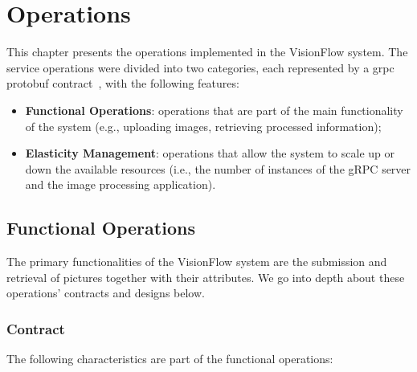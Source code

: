 \chapter{Operations}\label{ch:operations}

This chapter presents the operations implemented in the VisionFlow system.
The service operations were divided into two categories, each represented by a grpc protobuf contract~\cite{grpc-protobuf}, with the following features:

\begin{itemize}
    \item \textbf{Functional Operations}: operations that are part of the main functionality of the system (e.g., uploading images, retrieving processed information);
    \item \textbf{Elasticity Management}: operations that allow the system to scale up or down the available resources (i.e., the number of instances of the gRPC server and the image processing application).
\end{itemize}

\section{Functional Operations}\label{sec:functional_operations}

The primary functionalities of the VisionFlow system are the submission and retrieval of pictures together with their attributes. We go into depth about these operations' contracts and designs below.

\subsection{Contract}\label{subsec:functional-operations-contract}

The following characteristics are part of the functional operations:

